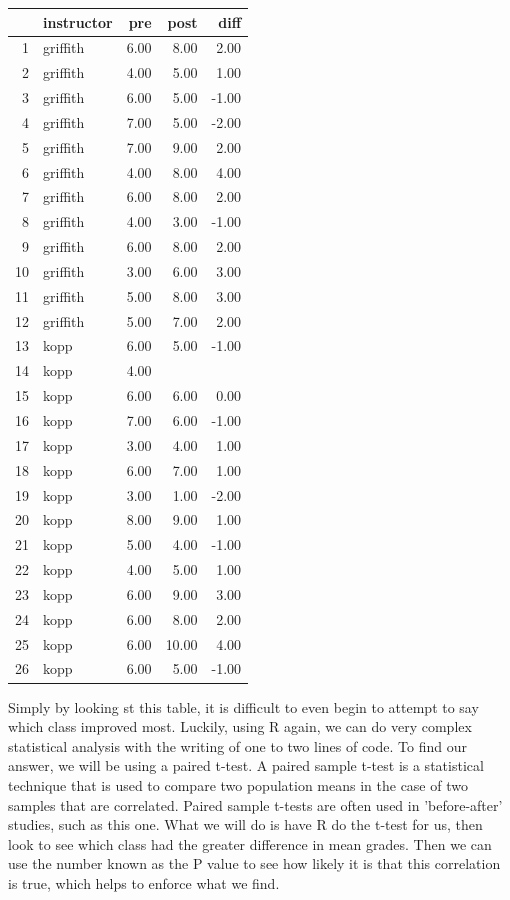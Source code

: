 \documentclass[titlepage]{article}\usepackage[]{graphicx}\usepackage[]{color}
\begin{document}
% 
\begin{tabular}{rlrrr}
  \hline
 & instructor & pre & post & diff \\ 
  \hline
1 & griffith & 6.00 & 8.00 & 2.00 \\ 
  2 & griffith & 4.00 & 5.00 & 1.00 \\ 
  3 & griffith & 6.00 & 5.00 & -1.00 \\ 
  4 & griffith & 7.00 & 5.00 & -2.00 \\ 
  5 & griffith & 7.00 & 9.00 & 2.00 \\ 
  6 & griffith & 4.00 & 8.00 & 4.00 \\ 
  7 & griffith & 6.00 & 8.00 & 2.00 \\ 
  8 & griffith & 4.00 & 3.00 & -1.00 \\ 
  9 & griffith & 6.00 & 8.00 & 2.00 \\ 
  10 & griffith & 3.00 & 6.00 & 3.00 \\ 
  11 & griffith & 5.00 & 8.00 & 3.00 \\ 
  12 & griffith & 5.00 & 7.00 & 2.00 \\ 
  13 & kopp & 6.00 & 5.00 & -1.00 \\ 
  14 & kopp & 4.00 &  &  \\ 
  15 & kopp & 6.00 & 6.00 & 0.00 \\ 
  16 & kopp & 7.00 & 6.00 & -1.00 \\ 
  17 & kopp & 3.00 & 4.00 & 1.00 \\ 
  18 & kopp & 6.00 & 7.00 & 1.00 \\ 
  19 & kopp & 3.00 & 1.00 & -2.00 \\ 
  20 & kopp & 8.00 & 9.00 & 1.00 \\ 
  21 & kopp & 5.00 & 4.00 & -1.00 \\ 
  22 & kopp & 4.00 & 5.00 & 1.00 \\ 
  23 & kopp & 6.00 & 9.00 & 3.00 \\ 
  24 & kopp & 6.00 & 8.00 & 2.00 \\ 
  25 & kopp & 6.00 & 10.00 & 4.00 \\ 
  26 & kopp & 6.00 & 5.00 & -1.00 \\ 
   \hline
\end{tabular}


\bigskip

Simply by looking st this table, it is difficult to even begin to attempt to say which class improved most. Luckily, using R again, we can do very complex statistical analysis with the writing of one to two lines of code. To find our answer, we will be using a paired t-test. A paired sample t-test is a statistical technique that is used to compare two population means in the case of two samples that are correlated. Paired sample t-tests are often used in 'before-after' studies, such as this one. What we will do is have R do the t-test for us, then look to see which class had the greater difference in mean grades. Then we can use the number known as the P value to see how likely it is that this correlation is true, which helps to enforce what we find.
\end{document}
